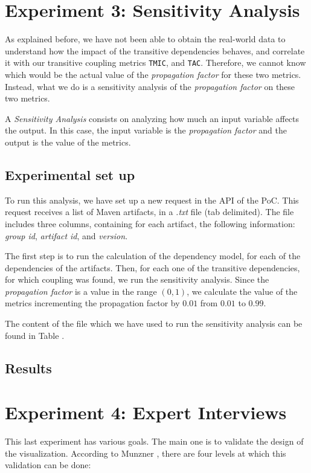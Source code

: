 \section{Experiment 3: Sensitivity Analysis}
As explained before, we have not been able to obtain the real-world data to understand how the impact of the transitive dependencies behaves, and correlate it with our transitive coupling metrics \texttt{TMIC}, and \texttt{TAC}. Therefore, we cannot know which would be the actual value of the \textit{propagation factor} for these two metrics. Instead, what we do is a sensitivity analysis of the \textit{propagation factor} on these two metrics.

A \textit{Sensitivity Analysis} consists on analyzing how much an input variable affects the output. In this case, the input variable is the \textit{propagation factor} and the output is the value of the metrics.

\subsection{Experimental set up}

To run this analysis, we have set up a new request in the API of the PoC. This request receives a list of Maven artifacts, in a \textit{.txt} file (tab delimited). The file includes three columns, containing for each artifact, the following information: \textit{group id}, \textit{artifact id}, and \textit{version}.

The first step is to run the calculation of the dependency model, for each of the dependencies of the artifacts. Then, for each one of the transitive dependencies, for which coupling was found, we run the sensitivity analysis. Since the \textit{propagation factor} is a value in the range $(0,1)$, we calculate the value of the metrics incrementing the propagation factor by $0.01$ from $0.01$ to $0.99$.

The content of the file which we have used to run the sensitivity analysis can be found in Table .

\subsection{Results}

\section{Experiment 4: Expert Interviews}
This last experiment has various goals. The main one is to validate the design of the visualization. According to Munzner \cite{Munzner2009}, there are four levels at which this validation can be done:

